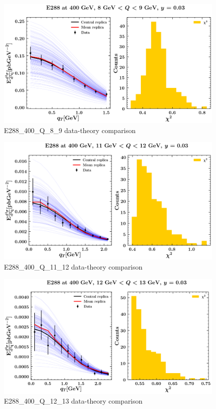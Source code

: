 \documentclass[
]{article}
\begin{document}
\begin{figure}
\centering
\includegraphics{pngplots/E288_400_Q_8_9.png}
\caption{E288\_400\_Q\_8\_9 data-theory comparison}
\end{figure}

\begin{figure}
\centering
\includegraphics{pngplots/E288_400_Q_11_12.png}
\caption{E288\_400\_Q\_11\_12 data-theory comparison}
\end{figure}

\begin{figure}
\centering
\includegraphics{pngplots/E288_400_Q_12_13.png}
\caption{E288\_400\_Q\_12\_13 data-theory comparison}
\end{figure}
\end{document}
